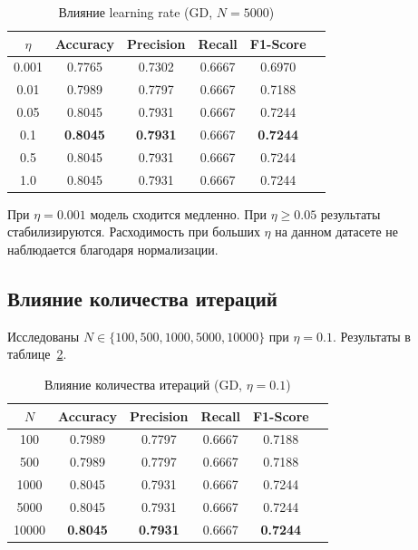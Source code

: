 \documentclass[12pt,a4paper]{article}
\begin{document}
\begin{table}[H]
    \centering
    \caption{Влияние learning rate (GD, \(N = 5000\))}
    \label{tab:lr}
    \begin{tabular}{cccccc}
        \toprule
        \(\eta\) & Accuracy & Precision & Recall & F1-Score \\
        \midrule
        0.001 & 0.7765 & 0.7302 & 0.6667 & 0.6970 \\
        0.01  & 0.7989 & 0.7797 & 0.6667 & 0.7188 \\
        0.05  & 0.8045 & 0.7931 & 0.6667 & 0.7244 \\
        0.1   & \textbf{0.8045} & \textbf{0.7931} & 0.6667 & \textbf{0.7244} \\
        0.5   & 0.8045 & 0.7931 & 0.6667 & 0.7244 \\
        1.0   & 0.8045 & 0.7931 & 0.6667 & 0.7244 \\
        \bottomrule
    \end{tabular}
\end{table}

При \(\eta = 0.001\) модель сходится медленно. При \(\eta \geq 0.05\)
результаты стабилизируются. Расходимость при больших \(\eta\) на данном
датасете не наблюдается благодаря нормализации.

\subsection{Влияние количества итераций}

Исследованы \(N \in \{100, 500, 1000, 5000, 10000\}\) при \(\eta = 0.1\).
Результаты в таблице~\ref{tab:niter}.

\begin{table}[H]
    \centering
    \caption{Влияние количества итераций (GD, \(\eta = 0.1\))}
    \label{tab:niter}
    \begin{tabular}{cccccc}
        \toprule
        \(N\) & Accuracy & Precision & Recall & F1-Score \\
        \midrule
        100   & 0.7989 & 0.7797 & 0.6667 & 0.7188 \\
        500   & 0.7989 & 0.7797 & 0.6667 & 0.7188 \\
        1000  & 0.8045 & 0.7931 & 0.6667 & 0.7244 \\
        5000  & 0.8045 & 0.7931 & 0.6667 & 0.7244 \\
        10000 & \textbf{0.8045} & \textbf{0.7931} & 0.6667 & \textbf{0.7244} \\
        \bottomrule
    \end{tabular}
\end{table}
\end{document}
